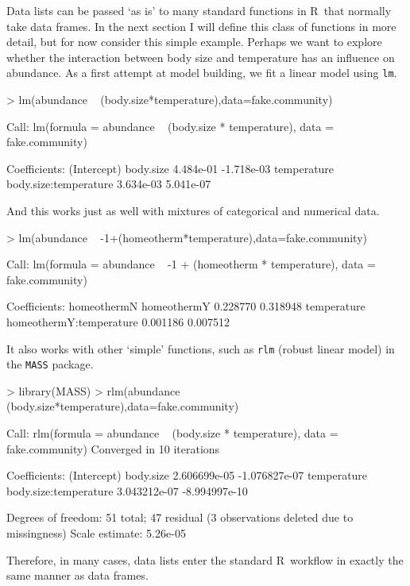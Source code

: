 \documentclass{article}
\newcommand{\R}{{\sf R}}
\newcommand{\code}[1]{\texttt{#1}}
\numberwithin{exercise}{section}
\begin{document}
Data lists can be passed `as is' to many standard functions in \R\ that normally take data frames.  In the next section I will define this class of functions in more detail, but for now consider this simple example.  Perhaps we want to explore whether the interaction between body size and temperature has an influence on abundance.  As a first attempt at model building, we fit a linear model using \code{lm}.
\begin{Schunk}
\begin{Sinput}
> lm(abundance ~ (body.size*temperature),data=fake.community)
\end{Sinput}
\begin{Soutput}
Call:
lm(formula = abundance ~ (body.size * temperature), data = fake.community)

Coefficients:
          (Intercept)              body.size  
            4.484e-01             -1.718e-03  
          temperature  body.size:temperature  
            3.634e-03              5.041e-07  
\end{Soutput}
\end{Schunk}
And this works just as well with mixtures of categorical and numerical data.
\begin{Schunk}
\begin{Sinput}
> lm(abundance ~ -1+(homeotherm*temperature),data=fake.community)
\end{Sinput}
\begin{Soutput}
Call:
lm(formula = abundance ~ -1 + (homeotherm * temperature), data = fake.community)

Coefficients:
            homeothermN              homeothermY  
               0.228770                 0.318948  
            temperature  homeothermY:temperature  
               0.001186                 0.007512  
\end{Soutput}
\end{Schunk}
It also works with other `simple' functions, such as \code{rlm} (robust linear model) in the \code{MASS} package.
\begin{Schunk}
\begin{Sinput}
> library(MASS)
> rlm(abundance ~ (body.size*temperature),data=fake.community)
\end{Sinput}
\begin{Soutput}
Call:
rlm(formula = abundance ~ (body.size * temperature), data = fake.community)
Converged in 10 iterations

Coefficients:
          (Intercept)             body.size 
         2.606699e-05         -1.076827e-07 
          temperature body.size:temperature 
         3.043212e-07         -8.994997e-10 

Degrees of freedom: 51 total; 47 residual
  (3 observations deleted due to missingness)
Scale estimate: 5.26e-05 
\end{Soutput}
\end{Schunk}
\noindent Therefore, in many cases, data lists enter the standard \R\ workflow in exactly the same manner as data frames.
\end{document}
